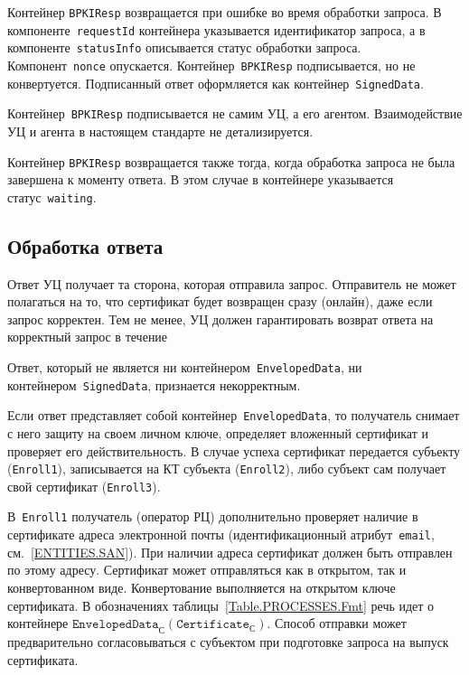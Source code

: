 Контейнер \texttt{BPKIResp} возвращается при ошибке во время обработки
запроса. В компоненте~\texttt{requestId} контейнера указывается идентификатор 
запроса, а в компоненте~\texttt{statusInfo} описывается статус обработки 
запроса. Компонент~\texttt{nonce} опускается.
%
Контейнер~\texttt{BPKIResp} подписывается, но не конвертуется.
%
Подписанный ответ оформляется как контейнер~\texttt{SignedData}.

Контейнер~\texttt{BPKIResp} подписывается не самим УЦ, 
а его агентом. Взаимодействие УЦ и агента в настоящем стандарте не 
детализируется.

Контейнер \texttt{BPKIResp} возвращается также тогда,
когда обработка запроса не была завершена к моменту ответа.
В этом случае в контейнере указывается статус~\texttt{waiting}.

\subsection{Обработка ответа}\label{PROCESSES.Enroll.Finish}

Ответ УЦ получает та сторона, которая отправила запрос.
Отправитель не может полагаться на то, что сертификат
будет возвращен сразу (онлайн), даже если запрос корректен.
%
Тем не менее, УЦ должен гарантировать возврат ответа на корректный запрос  
в течение  

Ответ, который не является ни контейнером~\texttt{EnvelopedData},
ни контейнером~\texttt{SignedData}, признается некорректным.

Если ответ представляет собой контейнер~\texttt{EnvelopedData}, 
то получатель снимает с него защиту на своем личном ключе, определяет 
вложенный сертификат и проверяет его действительность. 
%
В случае успеха сертификат передается субъекту (\texttt{Enroll1}),
записывается на КТ субъекта (\texttt{Enroll2}),
либо субъект сам получает свой сертификат (\texttt{Enroll3}).

В~\texttt{Enroll1} получатель (оператор РЦ) дополнительно 
проверяет наличие в сертификате адреса электронной почты 
(идентификационный атрибут~\texttt{email}, см.~\ref{ENTITIES.SAN}). 
При наличии адреса сертификат должен быть отправлен по этому адресу. 
Сертификат может отправляться как в открытом, так и 
конвертованном виде.
%
Конвертование выполняется на открытом ключе сертификата.
В обозначениях таблицы~\ref{Table.PROCESSES.Fmt}
речь идет о контейнере
$\texttt{EnvelopedData}_{\text{С}}(\texttt{Certificate}_{\text{С}})$.
%
Способ отправки может предварительно согласовываться с субъектом при 
подготовке запроса на выпуск сертификата.

